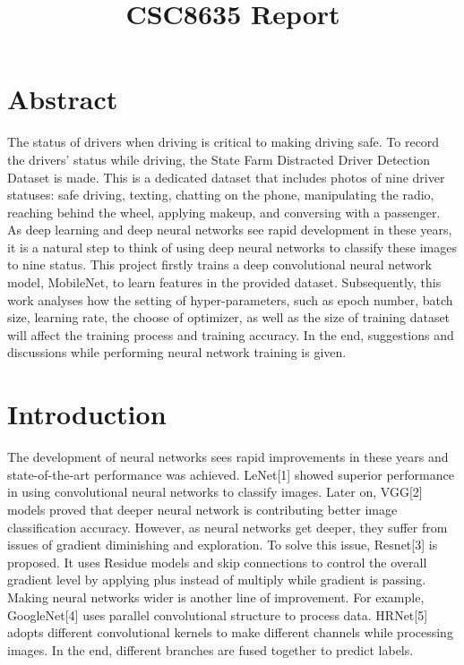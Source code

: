 \documentclass[11pt]{article}
\title{CSC8635 Report}
\begin{document}
    
    \maketitle
    
    

    
    \hypertarget{abstract}{%
\section{Abstract}\label{abstract}}

The status of drivers when driving is critical to making driving safe.
To record the drivers' status while driving, the State Farm Distracted
Driver Detection Dataset is made. This is a dedicated dataset that
includes photos of nine driver statuses: safe driving, texting, chatting
on the phone, manipulating the radio, reaching behind the wheel,
applying makeup, and conversing with a passenger. As deep learning and
deep neural networks see rapid development in these years, it is a
natural step to think of using deep neural networks to classify these
images to nine status. This project firstly trains a deep convolutional
neural network model, MobileNet, to learn features in the provided
dataset. Subsequently, this work analyses how the setting of
hyper-parameters, such as epoch number, batch size, learning rate, the
choose of optimizer, as well as the size of training dataset will affect
the training process and training accuracy. In the end, suggestions and
discussions while performing neural network training is given.

\hypertarget{introduction}{%
\section{Introduction}\label{introduction}}

    The development of neural networks sees rapid improvements in these
years and state-of-the-art performance was achieved. LeNet{[}1{]} showed
superior performance in using convolutional neural networks to classify
images. Later on, VGG{[}2{]} models proved that deeper neural network is
contributing better image classification accuracy. However, as neural
networks get deeper, they suffer from issues of gradient diminishing and
exploration. To solve this issue, Resnet{[}3{]} is proposed. It uses
Residue models and skip connections to control the overall gradient
level by applying plus instead of multiply while gradient is passing.
Making neural networks wider is another line of improvement. For
example, GoogleNet{[}4{]} uses parallel convolutional structure to
process data. HRNet{[}5{]} adopts different convolutional kernels to
make different channels while processing images. In the end, different
branches are fused together to predict labels.
\end{document}

